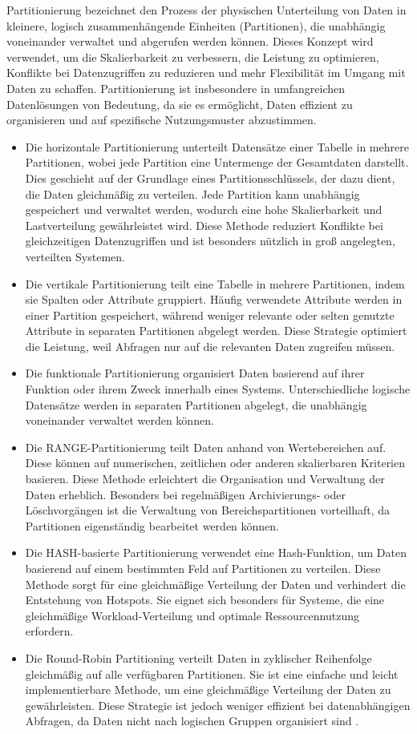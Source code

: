 Partitionierung bezeichnet den Prozess der physischen Unterteilung von Daten in kleinere, logisch zusammenhängende Einheiten (Partitionen), die unabhängig voneinander verwaltet und abgerufen werden können. Dieses Konzept wird verwendet, um die Skalierbarkeit zu verbessern, die Leistung zu optimieren, Konflikte bei Datenzugriffen zu reduzieren und mehr Flexibilität im Umgang mit Daten zu schaffen. Partitionierung ist insbesondere in umfangreichen Datenlösungen von Bedeutung, da sie es ermöglicht, Daten effizient zu organisieren und auf spezifische Nutzungsmuster abzustimmen.

\begin{itemize}
    \item Die horizontale Partitionierung unterteilt Datensätze einer Tabelle in mehrere Partitionen, wobei jede Partition eine Untermenge der Gesamtdaten darstellt. Dies geschieht auf der Grundlage eines Partitionsschlüssels, der dazu dient, die Daten gleichmäßig zu verteilen. Jede Partition kann unabhängig gespeichert und verwaltet werden, wodurch eine hohe Skalierbarkeit und Lastverteilung gewährleistet wird. Diese Methode reduziert Konflikte bei gleichzeitigen Datenzugriffen und ist besonders nützlich in groß angelegten, verteilten Systemen.
    \item Die vertikale Partitionierung teilt eine Tabelle in mehrere Partitionen, indem sie Spalten oder Attribute gruppiert. Häufig verwendete Attribute werden in einer Partition gespeichert, während weniger relevante oder selten genutzte Attribute in separaten Partitionen abgelegt werden. Diese Strategie optimiert die Leistung, weil Abfragen nur auf die relevanten Daten zugreifen müssen.
    \item Die funktionale Partitionierung organisiert Daten basierend auf ihrer Funktion oder ihrem Zweck innerhalb eines Systems. Unterschiedliche logische Datensätze werden in separaten Partitionen abgelegt, die unabhängig voneinander verwaltet werden können.
    \item Die RANGE-Partitionierung teilt Daten anhand von Wertebereichen auf. Diese können auf numerischen, zeitlichen oder anderen skalierbaren Kriterien basieren. Diese Methode erleichtert die Organisation und Verwaltung der Daten erheblich. Besonders bei regelmäßigen Archivierungs- oder Löschvorgängen ist die Verwaltung von Bereichspartitionen vorteilhaft, da Partitionen eigenständig bearbeitet werden können.
    \item Die HASH-basierte Partitionierung verwendet eine Hash-Funktion, um Daten basierend auf einem bestimmten Feld auf Partitionen zu verteilen. Diese Methode sorgt für eine gleichmäßige Verteilung der Daten und verhindert die Entstehung von Hotspots. Sie eignet sich besonders für Systeme, die eine gleichmäßige Workload-Verteilung und optimale Ressourcennutzung erfordern.
    \item Die Round-Robin Partitioning verteilt Daten in zyklischer Reihenfolge gleichmäßig auf alle verfügbaren Partitionen. Sie ist eine einfache und leicht implementierbare Methode, um eine gleichmäßige Verteilung der Daten zu gewährleisten. Diese Strategie ist jedoch weniger effizient bei datenabhängigen Abfragen, da Daten nicht nach logischen Gruppen organisiert sind \cite{g4g-partitioning}.
    

\end{itemize}
